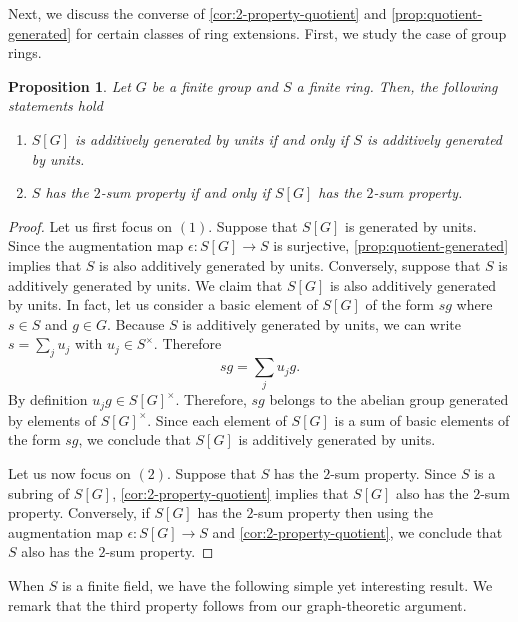 \documentclass[11pt, a4paper]{amsart}
\newtheorem{prop}[thm]{Proposition}
\theoremstyle{definition}
\numberwithin{equation}{section}
\begin{document}
Next, we discuss the converse of \cref{cor:2-property-quotient} and \cref{prop:quotient-generated} for certain classes of ring extensions. First, we study the case of group rings. 

\begin{prop}
    Let $G$ be a finite group and $S$ a finite ring. Then, the following statements hold 
    \begin{enumerate}
        \item $S[G]$ is additively generated by units if and only if $S$ is additively generated by units. 
        \item $S$ has the $2$-sum property if and only if $S[G]$ has the $2$-sum property. 
    \end{enumerate}
\end{prop}
\begin{proof}
Let us first focus on $(1).$ Suppose that $S[G]$ is generated by units. Since the augmentation map $ \epsilon\colon S[G] \to S$ is surjective, \cref{prop:quotient-generated} implies that $S$ is also additively generated by units. Conversely, suppose that $S$ is additively generated by units. We claim that $S[G]$ is also additively generated by units. In fact, let us consider a basic element of $S[G]$ of the form $sg$ where $s \in S$ and $g \in G.$ Because $S$ is additively generated by units,  we can write $s= \sum_{j} u_j$ with $u_j \in S^{\times}.$ Therefore 
\[ sg = \sum_{j} u_jg. \]
By definition $u_jg \in S[G]^{\times}.$ Therefore, $sg$ belongs to the abelian group generated by elements of $S[G]^{\times}.$ Since each element of $S[G]$ is a sum of basic elements of the form $sg$, we conclude that $S[G]$ is additively generated by units. 



Let us now focus on $(2).$ Suppose that $S$ has the $2$-sum property. Since $S$ is a subring of $S[G]$, \cref{cor:2-property-quotient} implies that $S[G]$ also has the $2$-sum property. Conversely, if $S[G]$ has the $2$-sum property then using the augmentation map $\epsilon\colon S[G] \to S$ and \cref{cor:2-property-quotient}, we conclude that $S$ also has the $2$-sum property. 
    \end{proof}

When $S$ is a finite field, we have the following simple yet interesting result. We remark that the third property follows from our graph-theoretic argument. 
\end{document}
